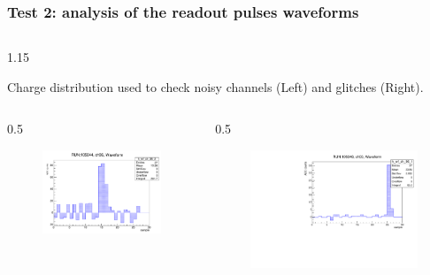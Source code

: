 \documentclass{beamer}
\begin{document}
\begin{frame}
\frametitle{Test 2: analysis of the readout pulses waveforms}
        \vspace{-4mm}
    \begin{columns}
\begin{column}{1.15\framewidth}
    \setlength{\leftmargini}{1.2em}
 \begin{itemize}
{\small \item Charge distribution used to check noisy channels (Left) and glitches (Right).}
  \end{itemize}
    \end{column}
    \end{columns}

     \vspace{-3mm}
    \begin{columns}
\begin{column}{0.5\framewidth}
         \begin{figure}[!h]
      \centering
      \hspace*{-1em}
    \includegraphics[width=0.95\columnwidth]{figures/pdf/noise.pdf}
     \label{fig:normalhits}
\end{figure}
\end{column}
\begin{column}{0.5\framewidth}
      \begin{figure}[!h]
      \centering
            \hspace*{-1em}
\includegraphics[width=0.95\columnwidth]{figures/pdf/glitch.pdf}

\end{figure}
\end{column}
\end{columns}
\end{frame}
\end{document}
